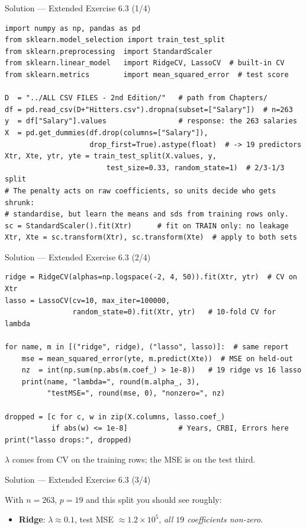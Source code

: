 \documentclass[aspectratio=169,11pt]{beamer}
\begin{document}
\begin{frame}[fragile]{Solution --- Extended Exercise 6.3 (1/4)}
  \begin{lstlisting}
import numpy as np, pandas as pd
from sklearn.model_selection import train_test_split
from sklearn.preprocessing  import StandardScaler
from sklearn.linear_model   import RidgeCV, LassoCV  # built-in CV
from sklearn.metrics        import mean_squared_error  # test score

D  = "../ALL CSV FILES - 2nd Edition/"   # path from Chapters/
df = pd.read_csv(D+"Hitters.csv").dropna(subset=["Salary"])  # n=263
y  = df["Salary"].values                 # response: the 263 salaries
X  = pd.get_dummies(df.drop(columns=["Salary"]),
                    drop_first=True).astype(float)  # -> 19 predictors
Xtr, Xte, ytr, yte = train_test_split(X.values, y,
                        test_size=0.33, random_state=1)  # 2/3-1/3 split
# The penalty acts on raw coefficients, so units decide who gets shrunk:
# standardise, but learn the means and sds from training rows only.
sc = StandardScaler().fit(Xtr)      # fit on TRAIN only: no leakage
Xtr, Xte = sc.transform(Xtr), sc.transform(Xte)  # apply to both sets
  \end{lstlisting}
\end{frame}

\begin{frame}[fragile]{Solution --- Extended Exercise 6.3 (2/4)}
  \begin{lstlisting}
ridge = RidgeCV(alphas=np.logspace(-2, 4, 50)).fit(Xtr, ytr)  # CV on Xtr
lasso = LassoCV(cv=10, max_iter=100000,
                random_state=0).fit(Xtr, ytr)   # 10-fold CV for lambda

for name, m in [("ridge", ridge), ("lasso", lasso)]:  # same report
    mse = mean_squared_error(yte, m.predict(Xte))  # MSE on held-out
    nz  = int(np.sum(np.abs(m.coef_) > 1e-8))   # 19 ridge vs 16 lasso
    print(name, "lambda=", round(m.alpha_, 3),
          "testMSE=", round(mse, 0), "nonzero=", nz)

dropped = [c for c, w in zip(X.columns, lasso.coef_)
           if abs(w) <= 1e-8]            # Years, CRBI, Errors here
print("lasso drops:", dropped)
  \end{lstlisting}
  \begin{readme}
    $\lambda$ comes from CV on the training rows; the MSE is on the test third.
  \end{readme}
\end{frame}

\begin{frame}{Solution --- Extended Exercise 6.3 (3/4)}
  \begin{solutionbox}
    With $n=263$, $p=19$ and this split you should see roughly:
    \begin{itemize}
      \item \textbf{Ridge}: $\lambda\approx0.1$, test MSE
            $\approx1.2\times10^5$, \emph{all $19$ coefficients
            non-zero}.
  \end{itemize}
  \end{solutionbox}
\end{frame}
\end{document}
